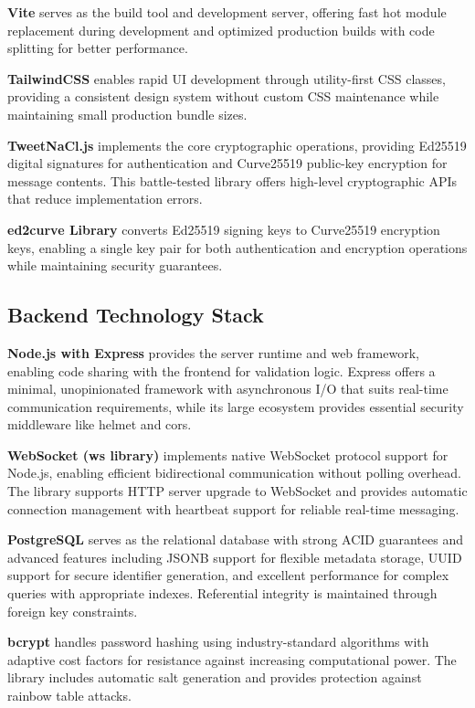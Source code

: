 \documentclass[12pt,a4paper,openany]{book}
\begin{document}
\textbf{Vite} serves as the build tool and development server, offering fast hot module replacement during development and optimized production builds with code splitting for better performance.

\textbf{TailwindCSS} enables rapid UI development through utility-first CSS classes, providing a consistent design system without custom CSS maintenance while maintaining small production bundle sizes.

\textbf{TweetNaCl.js} implements the core cryptographic operations, providing Ed25519 digital signatures for authentication and Curve25519 public-key encryption for message contents. This battle-tested library offers high-level cryptographic APIs that reduce implementation errors.

\textbf{ed2curve Library} converts Ed25519 signing keys to Curve25519 encryption keys, enabling a single key pair for both authentication and encryption operations while maintaining security guarantees.

\subsection{Backend Technology Stack}

\textbf{Node.js with Express} provides the server runtime and web framework, enabling code sharing with the frontend for validation logic. Express offers a minimal, unopinionated framework with asynchronous I/O that suits real-time communication requirements, while its large ecosystem provides essential security middleware like helmet and cors.

\textbf{WebSocket (ws library)} implements native WebSocket protocol support for Node.js, enabling efficient bidirectional communication without polling overhead. The library supports HTTP server upgrade to WebSocket and provides automatic connection management with heartbeat support for reliable real-time messaging.

\textbf{PostgreSQL} serves as the relational database with strong ACID guarantees and advanced features including JSONB support for flexible metadata storage, UUID support for secure identifier generation, and excellent performance for complex queries with appropriate indexes. Referential integrity is maintained through foreign key constraints.

\textbf{bcrypt} handles password hashing using industry-standard algorithms with adaptive cost factors for resistance against increasing computational power. The library includes automatic salt generation and provides protection against rainbow table attacks.
\end{document}
